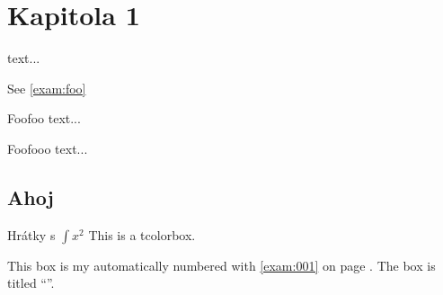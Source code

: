 \documentclass{scrbook}
\begin{document}
\chapter{Kapitola 1}
\begin{mytheo*}{}
  text...
\end{mytheo*}

See \ref{exam:foo} 

\begin{mytheo}{Foo}{foo}
  text...
\end{mytheo}

\begin{mytheo}{Foo}{fooo}
  text...
\end{mytheo}

\section{Ahoj}
  \begin{pabox}[label={exam:001},nameref={Aplikace \(\int x^2\) tvaru}]{Hrátky s \Large\(\int x^2\)}
    This is a tcolorbox.
  \end{pabox}
    This box is my automatically numbered with \ref{exam:001} on page
    \pageref{exam:001}.
    The box is titled \enquote{}.

  
\end{document}
